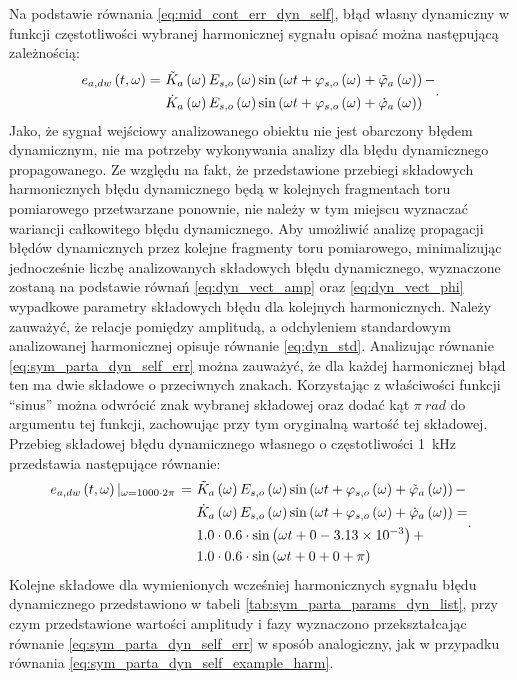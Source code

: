 Na podstawie równania \eqref{eq:mid_cont_err_dyn_self}, błąd własny dynamiczny w funkcji częstotliwości wybranej harmonicznej sygnału opisać można następującą zależnością:
\begin{equation}
\begin{split}
e_{a,dw} \left(t,\omega\right) = ~
& \tilde{K}_{a} \left(\omega\right) E_{s,o} \left(\omega\right) \sin \left( \omega t + \varphi_{s,o} \left(\omega\right) + \tilde{\varphi}_{a} \left(\omega\right) \right) - \\
& \dot{K}_{a} \left(\omega\right) E_{s,o} \left(\omega\right) \sin \left( \omega t + \varphi_{s,o} \left(\omega\right) + \dot{\varphi}_{a} \left(\omega\right) \right)
\end{split}
\label{eq:sym_parta_dyn_self_err}.
\end{equation}
Jako, że sygnał wejściowy analizowanego obiektu nie jest obarczony błędem dynamicznym, nie ma potrzeby wykonywania analizy dla błędu dynamicznego propagowanego. Ze względu na fakt, że przedstawione przebiegi składowych harmonicznych błędu dynamicznego będą w kolejnych fragmentach toru pomiarowego przetwarzane ponownie, nie należy w tym miejscu wyznaczać wariancji całkowitego błędu dynamicznego. Aby umożliwić analizę propagacji błędów dynamicznych przez kolejne fragmenty toru pomiarowego, minimalizując jednocześnie liczbę analizowanych składowych błędu dynamicznego, wyznaczone zostaną na podstawie równań \eqref{eq:dyn_vect_amp} oraz \eqref{eq:dyn_vect_phi} wypadkowe parametry składowych błędu dla kolejnych harmonicznych. Należy zauważyć, że relacje pomiędzy amplitudą, a odchyleniem standardowym analizowanej harmonicznej opisuje równanie \eqref{eq:dyn_std}. Analizując równanie \eqref{eq:sym_parta_dyn_self_err} można zauważyć, że dla każdej harmonicznej błąd ten ma dwie składowe o przeciwnych znakach. Korzystając z właściwości funkcji \enquote{sinus} można odwrócić znak wybranej składowej oraz dodać kąt $\pi~\unit{rad}$ do argumentu tej funkcji, zachowując przy tym oryginalną wartość tej składowej. Przebieg składowej błędu dynamicznego własnego o częstotliwości \qty{1}{kHz} przedstawia następujące równanie:
\begin{equation}
\begin{split}
e_{a,dw} \left(t,\omega\right) \left|_{\omega = 1000 \cdot 2 \pi } \right. = ~
& \tilde{K}_{a} \left(\omega\right) E_{s,o} \left(\omega\right) \sin \left( \omega t + \varphi_{s,o} \left(\omega\right) + \tilde{\varphi}_{a} \left(\omega\right) \right) - \\
& \dot{K}_{a} \left(\omega\right) E_{s,o} \left(\omega\right) \sin \left( \omega t + \varphi_{s,o} \left(\omega\right) + \dot{\varphi}_{a} \left(\omega\right) \right) = \\
& 1.0 \cdot 0.6 \cdot \sin \left( \omega t + 0 - \num{3.13e-3} \right) + \\
& 1.0 \cdot 0.6 \cdot \sin \left( \omega t + 0 + 0 + \pi \right)
\end{split}
\label{eq:sym_parta_dyn_self_example_harm}.
\end{equation}
Kolejne składowe dla wymienionych wcześniej harmonicznych sygnału błędu dynamicznego przedstawiono w tabeli \ref{tab:sym_parta_params_dyn_list}, przy czym przedstawione wartości amplitudy i fazy wyznaczono przekształcając równanie \eqref{eq:sym_parta_dyn_self_err} w sposób analogiczny, jak w przypadku równania \eqref{eq:sym_parta_dyn_self_example_harm}.

